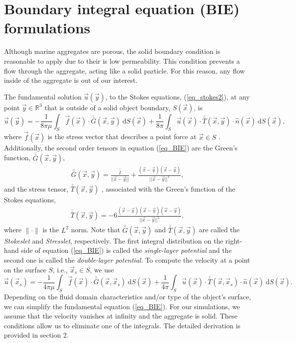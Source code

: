 \section{Boundary integral equation (BIE) formulations} 
Although marine aggregates are porous, the solid boundary condition is reasonable to apply due to their is low permeability. This condition prevents a flow through the aggregate, acting like a solid particle. For this reason, any flow inside of the aggregate is out of our interest.  
\par
The fundamental solution $\vec{u}(\vec{y})$, to the Stokes equations, (\ref{eq_stokes2}), at any point $\vec{y} \in \mathbb{R}^3$ that is outside of a solid object boundary, $S(\vec{x})$, is
\begin{equation}
   \vec{u}(\vec{y}) =
	- \frac{1}{8 \pi \mu} \int_S  \vec{f}(\vec{x}) \cdot \bar{\bar{G}}(\vec{x},\vec{y}) \ \text{d}S(\vec{x}) 
+ \frac{1}{8 \pi} \int_S
\vec{u}(\vec{x}) \cdot  \bar{\bar{T}}(\vec{x},\vec{y})  
\cdot \hat{n} ( \vec{x})
\ \text{d}S(\vec{x}),
\label{eq_BIE}
\end{equation}
where  $\vec{f}(\vec{x})$ is the stress vector that describes a point force at $\vec{x} \in S$ \cite{pozrikidis_boundary_1992}. Additionally, the second order tensors in equation (\ref{eq_BIE}) are the Green's function,  $\bar{\bar{G}}(\vec{x},\vec{y})$,
\begin{align}
  \bar{\bar{G}}(\vec{x},\vec{y}) =   
  \frac{\bar{\bar{I}}}{||\vec{x}-\vec{y}||} + \frac{(\vec{x}-\vec{y})(\vec{x}-\vec{y})}{||\vec{x}-\vec{y}||^3},
  \label{eq_stokeslet}
  \end{align}
  and the stress tensor, $\bar{\bar{T}}(\vec{x},\vec{y})$ , associated with the Green's function of the Stokes equations,
  \begin{align}
  \bar{\bar{T}}(\vec{x},\vec{y}) = 
  -6\frac{(\vec{x}-\vec{y})(\vec{x}-\vec{y}) (\vec{x}-\vec{y})}{||\vec{x}-\vec{y}||^5},
  \label{eq_stresslet}
  \end{align}
where $\| \cdot \|$ is the $L^2$ norm. 
Note that $ \bar{\bar{G}}(\vec{x},\vec{y})$ and $ \bar{\bar{T}}(\vec{x},\vec{y}) $ are called  the {\textit{Stokeslet}} and {\textit{Stresslet}}, respectively.
The first integral distribution on the right-hand side of equation (\ref{eq_BIE}) is called the \textit{single-layer potential} and the second one is called the \textit{double-layer potential}. 
To compute the velocity at a point on the surface $S$, i.e., $ \vec{x}_s \in S$, we use 
\begin{equation}
   \vec{u}(\vec{x}_s) = - \frac{1}{4 \pi \mu} \int_S  \vec{f}(\vec{x}) \cdot \bar{\bar{G}}(\vec{x},\vec{x}_s) \ \text{d}S(\vec{x}) 
+ \frac{1}{4 \pi} 
\int_S
\vec{u}(\vec{x}) \cdot  \bar{\bar{T}}(\vec{x},\vec{x}_s)  
\cdot \hat{n} ( \vec{x})
\ \text{d}S(\vec{x}).
\label{eq_BIE_onS}
\end{equation}
Depending on the fluid domain characteristics and/or type of the object's surface, we can simplify the fundamental equation (\ref{eq_BIE}).
For our simulations, we assume that the velocity vanishes at infinity and the aggregate is solid. These conditions allow us to eliminate one of the integrals. The detailed derivation is provided in section 2. 

